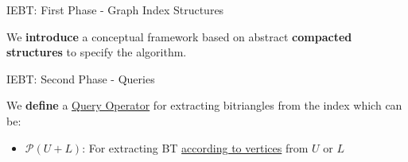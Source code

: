 \begin{frame}[fragile]{IEBT: First Phase - Graph Index Structures}
  \begin{center}
    \large We \textbf{introduce} a conceptual framework based on abstract \textbf{compacted structures} to specify the algorithm.
  \end{center}    
  \begin{table}[H]
    \centering
   \end{table}
\end{frame}

\begin{frame}[fragile]{IEBT: Second Phase - Queries}
  \begin{center}
    \large We \textbf{define} a \underline{\color{red}Query Operator} for extracting bitriangles from the index which can be:
  \end{center}  
  \vspace{2em}
  \begin{itemize}
    \setlength\itemsep{2em}
    \item \textbf{$\mathcal{P}(U+L)$}: For extracting BT \underline{\color{blue}according to vertices} from $U$ or $L$
  \end{itemize}  
\end{frame}

